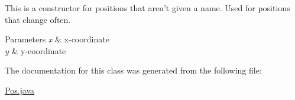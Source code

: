 This is a constructor for positions that aren't given a name. Used for positions that change often.


\begin{DoxyParams}{Parameters}
{\em x} & x-\/coordinate \\
\hline
{\em y} & y-\/coordinate \\
\hline
\end{DoxyParams}


The documentation for this class was generated from the following file:\begin{DoxyCompactItemize}
\item 
\hyperlink{Pos_8java}{Pos.java}\end{DoxyCompactItemize}
